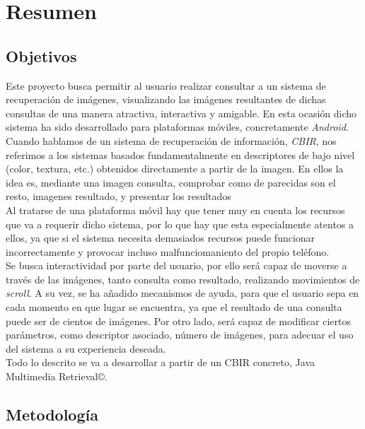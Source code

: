 \chapter{Resumen}
\label{cap:resumen}

\section{Objetivos}

Este proyecto busca permitir al usuario realizar consultar a un sistema de recuperación de imágenes, visualizando las imágenes resultantes de dichas consultas de una manera atractiva, interactiva y amigable. En esta ocasión dicho sistema ha sido desarrollado para plataformas móviles, concretamente \textit{Android}.\\

Cuando hablamos de un sistema de recuperación de información, \textit{CBIR}, nos referimos a los sistemas basados fundamentalmente en descriptores de bajo nivel (color, textura, etc.) obtenidos directamente a partir de la imagen. En ellos la idea es, mediante una imagen consulta, comprobar como de parecidas son el resto, imagenes resultado, y presentar los resultados\\

Al tratarse de una plataforma móvil hay que tener muy en cuenta los recursos que va a requerir dicho sistema, por lo que hay que esta especialmente atentos a ellos, ya que si el sistema necesita demasiados recursos puede funcionar incorrectamente y provocar incluso malfunciomaniento del propio teléfono.\\

Se busca interactividad por parte del usuario, por ello será capaz de moverse a través de las imágenes, tanto consulta como resultado, realizando movimientos de \textit{scroll}. A su vez, se ha añadido mecanismos de ayuda, para que el usuario sepa en cada momento en que lugar se encuentra, ya que el resultado de una consulta puede ser de cientos de imágenes. Por otro lado, será capaz de modificar ciertos parámetros, como descriptor asociado, número de imágenes, para adecuar el uso del sistema a su experiencia deseada.\\

Todo lo descrito se va a desarrollar a partir de un CBIR concreto, Java Multimedia Retrieval©.\\ 

\section{Metodología}

